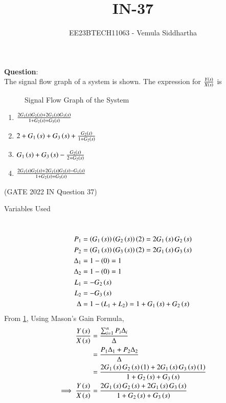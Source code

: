 \documentclass[journal,12pt,twocolumn]{IEEEtran}
\theoremstyle{remark}
\begin{document}

\vspace{3cm}

\title{IN-37}
\author{EE23BTECH11063 - Vemula Siddhartha}
\maketitle
\newpage
\bigskip

\renewcommand{\thefigure}{\theenumi}
\renewcommand{\thetable}{\theenumi}
\textbf{Question}:\\
The signal flow graph of a system is shown. The expression for $\frac{Y\left(s\right)}{X\left(s\right)}$ is
\begin{figure}[h]
    \centering
    
    \caption{Signal Flow Graph of the System}
    \label{fig:sfg_in-37-2022}
\end{figure}
\begin{enumerate}[label=(\alph*)]
    \item $\frac{2 G_1\left(s\right) G_2\left(s\right) + 2 G_1\left(s\right) G_3\left(s\right) }{ 1 + G_2\left(s\right) + G_3\left(s\right) }$
    \item $ 2 + G_1\left(s\right) + G_3\left(s\right) + \frac{G_2\left(s\right) }{ 1 + G_2\left(s\right)}$
    \item $G_1\left(s\right) + G_3\left(s\right) - \frac{G_2\left(s\right) }{ 2 + G_2\left(s\right) }$
    \item $\frac{ 2 G_1\left(s\right) G_2\left(s\right) + 2 G_1\left(s\right) G_3\left(s\right) - G_1\left(s\right) }{ 1 + G_2\left(s\right) + G_3\left(s\right) }$
\end{enumerate}\hfill(GATE 2022 IN Question 37) \\
\solution
\begin{table}[h!]    
    \centering
    
    \caption{Variables Used}
  \end{table}\\
  \begin{align}
    P_1 &= \left(G_1\left(s\right)\right) \left(G_2\left(s\right)\right) \left(2\right) = 2 G_1\left(s\right) G_2\left(s\right) \\
    P_2 &= \left(G_1\left(s\right)\right) \left(G_3\left(s\right)\right) \left(2\right) = 2 G_1\left(s\right) G_3\left(s\right) \\
    \Delta_1 &= 1 - \left(0\right) = 1 \\
    \Delta_2 &= 1 - \left(0\right) = 1 \\
    L_1 &= -G_2\left(s\right) \\
    L_2 &= -G_3\left(s\right) \\
    \Delta &= 1 - \left(L_1 + L_2\right) = 1 + G_1\left(s\right) + G_2\left(s\right)
  \end{align}
  From \ref{fig:sfg_in-37-2022}, Using Mason's Gain Formula,
  \begin{align}
    \frac { Y\left(s\right) }{ X\left(s\right) } &= \frac { \sum_{ i = 1 }^{ n } P_i \Delta_i } { \Delta } \\
    &= \frac { P_1 \Delta_1 + P_2 \Delta_2 } { \Delta } \\
    &= \frac { 2 G_1\left(s\right) G_2 \left(s\right) \left(1\right) + 2 G_1\left(s\right) G_3\left(s\right) \left(1\right) } { 1 + G_2\left(s\right) + G_3\left(s\right) } \\
    \implies \frac { Y\left(s\right) }{ X\left(s\right) } &= \frac { 2 G_1\left(s\right) G_2\left(s\right) + 2 G_1\left(s\right) G_3\left(s\right) } { 1 + G_2\left(s\right) + G_3\left(s\right) }
  \end{align}
\end{document}
